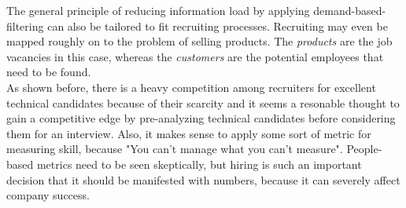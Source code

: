 
The general principle of reducing information load by applying
demand-based-filtering can also be tailored to fit recruiting processes.
Recruiting may even be mapped roughly on to the problem of selling products.
The \textit{products} are the job vacancies in this case, whereas the
\textit{customers} are the potential employees that need to be found.\\
As shown before, there is a heavy competition among recruiters for excellent
technical candidates because of their scarcity and it seems a resonable thought
to gain a competitive edge by pre-analyzing technical candidates
before considering them for an interview. Also, it makes sense to apply
some sort of metric for measuring skill, because
"You can't manage what you can't measure"\cite{tdm:1986}.  People-based metrics
need to be seen skeptically, but hiring is such an important decision that it
should be manifested with numbers, because it can severely affect
company success\cite{hk:1998}.